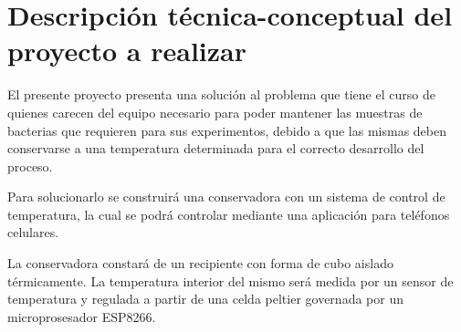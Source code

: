 \section{Descripción técnica-conceptual del proyecto a realizar}
\label{sec:descripcion}

\quad El presente proyecto presenta una solución al problema que tiene el curso de \empclientename\hspace{1px} quienes carecen del equipo necesario para poder mantener las muestras de bacterias que requieren para sus experimentos, debido a que las mismas deben conservarse a una temperatura determinada para el correcto desarrollo del proceso.

\quad Para solucionarlo se construirá una conservadora con un sistema de control de temperatura, la cual se podrá controlar mediante una aplicación para teléfonos celulares.

\quad La conservadora constará de un recipiente con forma de cubo aislado térmicamente. La temperatura interior del mismo será medida por un sensor de temperatura y regulada a partir de una celda peltier governada por un microprosesador ESP8266. 